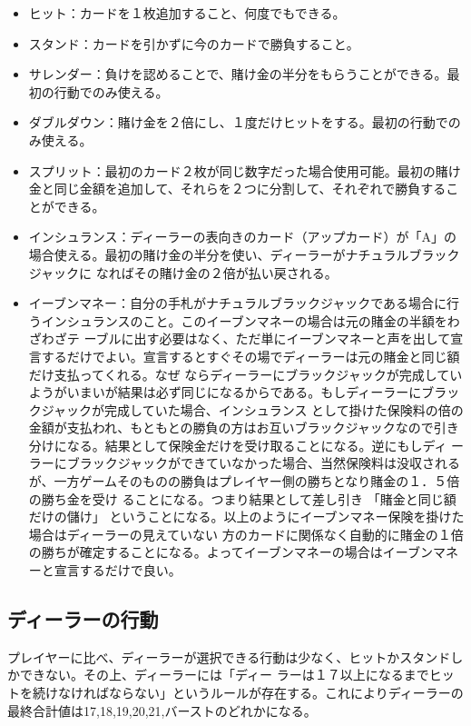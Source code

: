 \begin{itemize}
\item ヒット：カードを１枚追加すること、何度でもできる。
\item スタンド：カードを引かずに今のカードで勝負すること。
\item サレンダー：負けを認めることで、賭け金の半分をもらうことができる。最初の行動でのみ使える。
\item ダブルダウン：賭け金を２倍にし、１度だけヒットをする。最初の行動でのみ使える。
\item スプリット：最初のカード２枚が同じ数字だった場合使用可能。最初の賭け金と同じ金額を追加して、それらを２つに分割して、それぞれで勝負することができる。
\item インシュランス：ディーラーの表向きのカード（アップカード）が「A」の場合使える。最初の賭け金の半分を使い、ディーラーがナチュラルブラックジャックに
なればその賭け金の２倍が払い戻される。
\item イーブンマネー：自分の手札がナチュラルブラックジャックである場合に行うインシュランスのこと。このイーブンマネーの場合は元の賭金の半額をわざわざテ
ーブルに出す必要はなく、ただ単にイーブンマネーと声を出して宣言するだけでよい。宣言するとすぐその場でディーラーは元の賭金と同じ額だけ支払ってくれる。なぜ
ならディーラーにブラックジャックが完成していようがいまいが結果は必ず同じになるからである。もしディーラーにブラックジャックが完成していた場合、インシュランス
として掛けた保険料の倍の金額が支払われ、もともとの勝負の方はお互いブラックジャックなので引き分けになる。結果として保険金だけを受け取ることになる。逆にもしディ
ーラーにブラックジャックができていなかった場合、当然保険料は没収されるが、一方ゲームそのものの勝負はプレイヤー側の勝ちとなり賭金の１．５倍の勝ち金を受け
ることになる。つまり結果として差し引き 「賭金と同じ額だけの儲け」 ということになる。以上のようにイーブンマネー保険を掛けた場合はディーラーの見えていない
方のカードに関係なく自動的に賭金の１倍の勝ちが確定することになる。よってイーブンマネーの場合はイーブンマネーと宣言するだけで良い。
\end{itemize}

\subsection{ディーラーの行動}
プレイヤーに比べ、ディーラーが選択できる行動は少なく、ヒットかスタンドしかできない。その上、ディーラーには「ディー
ラーは１７以上になるまでヒットを続けなければならない」というルールが存在する。これによりディーラーの最終合計値は17,18,19,20,21,バーストのどれかになる。


